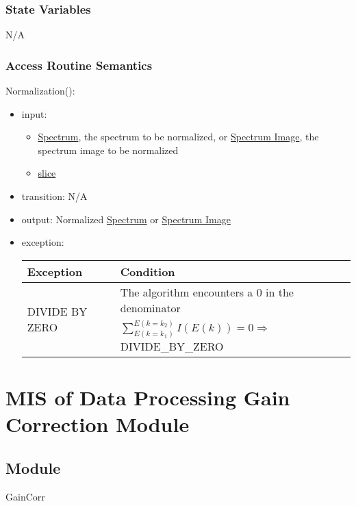 \documentclass[12pt, titlepage]{article}
\begin{document}
\subsubsection{State Variables}
N/A

\subsubsection{Access Routine Semantics}

\noindent Normalization():
\begin{itemize}
    \item input: 
    \begin{itemize}
        \item \hyperref[Mod:Spectrum]{Spectrum}, the spectrum to be normalized,
        or \hyperref[Mod:SI]{Spectrum Image}, the spectrum image to be normalized
        \item \hyperref[Mod:Slice1D]{slice}
    \end{itemize}
    \item transition: N/A
    \item output: Normalized \hyperref[Mod:Spectrum]{Spectrum} or
    \hyperref[Mod:SI]{Spectrum Image}
    \item exception:
    \begin{center}
        \begin{tabular}{p{3.5cm} p{12cm}}
            \toprule[0.15em]
            \textbf{Exception} & \textbf{Condition}\\
            \midrule[0.1em]
            \multirow{2}{0.25\textwidth}{DIVIDE BY ZERO} & The algorithm
            encounters a 0 in the denominator\\ 
            & $\sum_{E(k=k_1)}^{E(k=k_2)}{I(E(k))} = 0 \Rightarrow$
            DIVIDE\_BY\_ZERO\\ 
            \bottomrule[0.15em]
        \end{tabular}
    \end{center}
\end{itemize}

\section{MIS of Data Processing Gain Correction Module} \label{Mod:GainCorr}

\subsection{Module}
GainCorr
\end{document}
